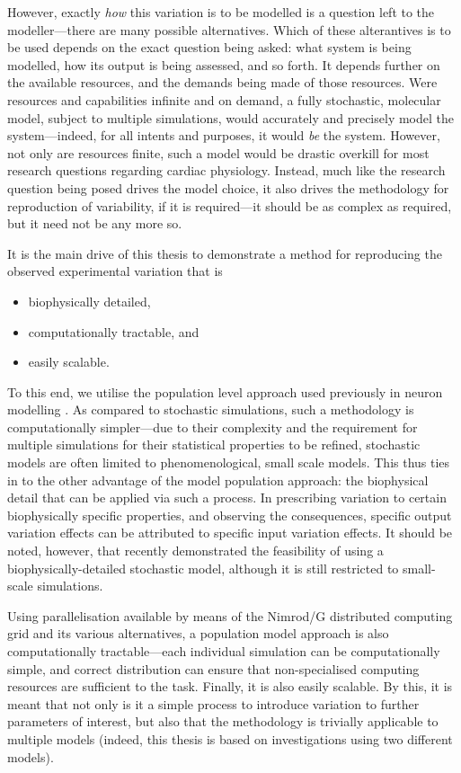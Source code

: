 \documentclass[../thesis-main.tex]{subfiles}
\begin{document}
However, exactly \emph{how} this variation is to be modelled is a question left to the modeller---there are many possible alternatives. Which of these alterantives is to be used depends on the exact question being asked: what system is being modelled, how its output is being assessed, and so forth. It depends further on the available resources, and the demands being made of those resources. Were resources and capabilities infinite and on demand, a fully stochastic, molecular model, subject to multiple simulations, would accurately and precisely model the system---indeed, for all intents and purposes, it would \emph{be} the system. However, not only are resources finite, such a model would be drastic overkill for most research questions regarding cardiac physiology. Instead, much like the research question being posed drives the model choice, it also drives the methodology for reproduction of variability, if it is required---it should be as complex as required, but it need not be any more so.

It is the main drive of this thesis to demonstrate a method for reproducing the observed experimental variation that is
\begin{itemize}
 \item biophysically detailed,
 \item computationally tractable, and
 \item easily scalable.
\end{itemize}
To this end, we utilise the population level approach used previously in neuron modelling \citep{Marder2011}. As compared to stochastic simulations, such a methodology is computationally simpler---due to their complexity and the requirement for multiple simulations for their statistical properties to be refined, stochastic models are often limited to phenomenological, small scale models. This thus ties in to the other advantage of the model population approach: the biophysical detail that can be applied via such a process. In prescribing variation to certain biophysically specific properties, and observing the consequences, specific output variation effects can be attributed to specific input variation effects. It should be noted, however, that \citet{Heijman2013} recently demonstrated the feasibility of using a biophysically-detailed stochastic model, although it is still restricted to small-scale simulations.

Using parallelisation available by means of the Nimrod/G distributed computing grid and its various alternatives, a population model approach is also computationally tractable---each individual simulation can be computationally simple, and correct distribution can ensure that non-specialised computing resources are sufficient to the task. Finally, it is also easily scalable. By this, it is meant that not only is it a simple process to introduce variation to further parameters of interest, but also that the methodology is trivially applicable to multiple models (indeed, this thesis is based on investigations using two different models).
\end{document}
